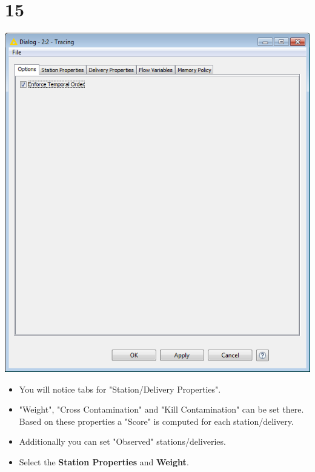 \documentclass[10pt]{beamer}
\begin{document}
\section{15}
\begin{frame}
	\begin{center}
  		\includegraphics[height=0.5\textheight]{15.png}
	\end{center}
	\begin{itemize}
		\item You will notice tabs for "Station/Delivery Properties".
		\item "Weight", "Cross Contamination" and "Kill Contamination" can be set there. Based on these properties a "Score" is computed for each station/delivery.
		\item Additionally you can set "Observed" stations/deliveries.
		\item Select the \textbf{Station Properties} and \textbf{Weight}.
	\end{itemize}
\end{frame}
\end{document}
